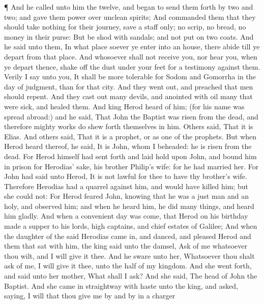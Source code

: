  ¶ And he called unto him the twelve, and began to send them
forth by two and two; and gave them power over unclean spirits;
 And commanded them that they should take nothing for their
journey, save a staff only; no scrip, no bread, no money in their purse:
 But be shod with sandals; and not put on two coats.
 And he said unto them, In what place soever ye enter into
an house, there abide till ye depart from that place.  And
whosoever shall not receive you, nor hear you, when ye depart thence,
shake off the dust under your feet for a testimony against them. Verily
I say unto you, It shall be more tolerable for Sodom and Gomorrha in the
day of judgment, than for that city.  And they went out,
and preached that men should repent.  And they cast out
many devils, and anointed with oil many that were sick, and healed them.
 And king Herod heard of him; (for his name was spread
abroad:) and he said, That John the Baptist was risen from the dead, and
therefore mighty works do shew forth themselves in him. 
Others said, That it is Elias. And others said, That it is a prophet, or
as one of the prophets.  But when Herod heard thereof, he
said, It is John, whom I beheaded: he is risen from the dead.
 For Herod himself had sent forth and laid hold upon John,
and bound him in prison for Herodias' sake, his brother Philip's wife:
for he had married her.  For John had said unto Herod, It
is not lawful for thee to have thy brother's wife. 
Therefore Herodias had a quarrel against him, and would have killed him;
but she could not:  For Herod feared John, knowing that he
was a just man and an holy, and observed him; and when he heard him, he
did many things, and heard him gladly.  And when a
convenient day was come, that Herod on his birthday made a supper to his
lords, high captains, and chief estates of Galilee;  And
when the daughter of the said Herodias came in, and danced, and pleased
Herod and them that sat with him, the king said unto the damsel, Ask of
me whatsoever thou wilt, and I will give it thee.  And he
sware unto her, Whatsoever thou shalt ask of me, I will give it thee,
unto the half of my kingdom.  And she went forth, and said
unto her mother, What shall I ask? And she said, The head of John the
Baptist.  And she came in straightway with haste unto the
king, and asked, saying, I will that thou give me by and by in a charger
